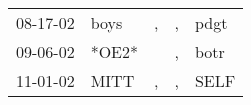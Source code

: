 \begin{supertabular}{lllll}
 08-17-02 &   boys &  , &  , &  pdgt \\
 09-06-02 &  *OE2* &    &  , &  botr \\
 11-01-02 &   MITT &  , &  , &  SELF \\
\end{supertabular}
